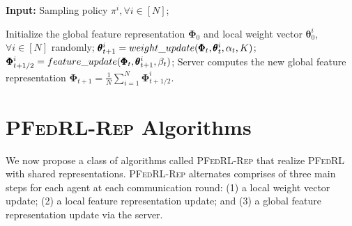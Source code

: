 \documentclass{article} %
\theoremstyle{plain}
\theoremstyle{definition}
\theoremstyle{remark}
\newcommand{\PFRL}{\textsc{PFedRL}\xspace}
\newcommand{\FedRL}{\textsc{PFedRL-Rep}\xspace}
\begin{document}
\begin{algorithm}[t]
	\caption{\FedRL: A General Description} 
	\label{alg:FedRL-Rep}
	\textbf{Input:} Sampling policy $\pi^i, \forall i\in[N]$;
	\begin{algorithmic}[1]
 \STATE Initialize the global feature representation $\pmb{\Phi}_0$ and local weight vector $\pmb{\theta}^i_0$, $\forall i\in[N]$ randomly; 
  \STATE $\pmb{\theta}_{t+1}^i=\textsc{weight\_{update}}(\pmb{\Phi}_{t}, \pmb{\theta}_{t}^i, \alpha_t, K)$; %
  \STATE $\pmb{\Phi}_{t+1/2}^i=\textsc{feature\_{update}}(\pmb{\Phi}_{t}, \pmb{\theta}_{t+1}^i, \beta_t)$; %
		\ENDFOR
  \STATE Server computes the new global feature representation $\pmb{\Phi}_{t+1}=\frac{1}{N}\sum_{i=1}^N \pmb{\Phi}^i_{t+1/2}$. %
  \ENDFOR
	\end{algorithmic}

\end{algorithm}


\vspace{-0.1in}
\section{\FedRL Algorithms}

\vspace{-0.1in}
We now propose a class of algorithms called \FedRL that realize \PFRL with shared representations. \FedRL alternates comprises of three main steps for each agent at each communication round: (1) a local weight vector update; (2) a local feature representation update; and (3) a global feature representation update via the server. 
\end{document}
